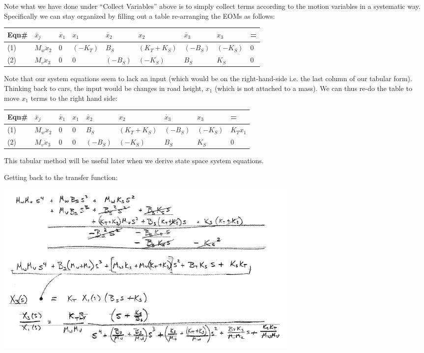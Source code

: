 %
\begin{ExampleCont}
Note what we have done under ``Collect Variables'' above is to simply collect terms according to the motion variables in a systematic
way.  Specifically we can stay organized by filling
out a table re-arranging the EOMs as follows:\vspace{0.3in}



\renewcommand\arraystretch{1.5}%


\begin{tabular}{|p{0.35in}|p{0.55in}|p{0.55in}|p{0.55in}|p{0.35in}|p{0.65in}|p{0.55in}|p{0.55in}|p{0.35in}|}\hline
  Eqn\# & $\ddot{x_j}$ & $\dot{x_1}$ & $x_1$  & $\dot{x_2}$ & ${x_2} $& $\dot{x_3}$ & ${x_3} $ &  = \\ \hline
  (1)   & $M_w\ddot{x}_2$ & 0 & $(-K_T)$ & $B_S$    & $(K_T+K_S)$ & $(-B_S)$ & $(-K_S)$ & 0  \\ \hline
  (2)   & $M_v\ddot{x}_3$ & 0 & 0        & $(-B_S)$ & $(-K_S)$    & $B_S$    & $K_S$    & 0 \\ \hline
\end{tabular}

Note that our system equations seem to lack an input (which would be on the right-hand-side i.e. the
last column of our tabular form).  Thinking back to cars, the input would be changes in road height,
$x_1$ (which is not attached to a mass).  We can thus re-do the table to move $x_1$ terms to
the right hand side:

\begin{tabular}{|p{0.35in}|p{0.55in}|p{0.55in}|p{0.55in}|p{0.35in}|p{0.65in}|p{0.55in}|p{0.55in}|p{0.35in}|}\hline
  Eqn\# & $\ddot{x_j}$ & $\dot{x_1}$ & $x_1$  & $\dot{x_2}$ & ${x_2} $& $\dot{x_3}$ & ${x_3} $ &  = \\ \hline
  (1)   & $M_w\ddot{x}_2$ & 0 & $0$ & $B_S$    & $(K_T+K_S)$ & $(-B_S)$ & $(-K_S)$ & $K_Tx_1$ \\ \hline
  (2)   & $M_v\ddot{x}_3$ & 0 & 0        & $(-B_S)$ & $(-K_S)$    & $B_S$    & $K_S$    & 0 \\ \hline
\end{tabular}

This tabular method will be useful later when we derive state space system equations.

Getting back to the transfer function:

\includegraphics[width=6.0in]{figs02/00961.png}


\end{ExampleCont}
